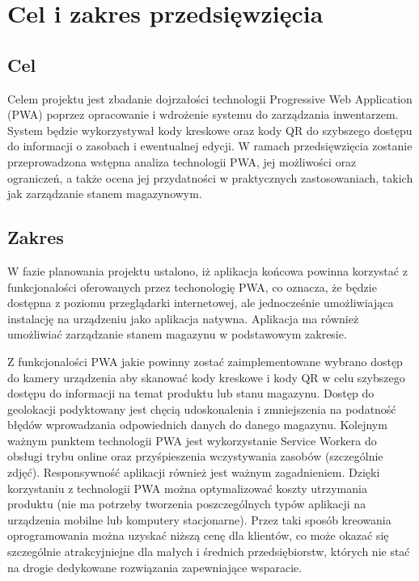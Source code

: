 \documentclass[../main.tex]{subfiles}
\begin{document}
\section{Cel i zakres przedsięwzięcia}
    \subsection{Cel}    
    Celem projektu jest zbadanie dojrzałości technologii Progressive Web Application (PWA)\cite{pwa} poprzez opracowanie i wdrożenie systemu do zarządzania inwentarzem. System będzie wykorzystywał kody kreskowe oraz kody QR do szybszego dostępu do informacji o zasobach i ewentualnej edycji. W ramach przedsięwzięcia zostanie przeprowadzona wstępna analiza technologii PWA, jej możliwości oraz ograniczeń, a także ocena jej przydatności w praktycznych zastosowaniach, takich jak zarządzanie stanem magazynowym.
        

    \subsection{Zakres}
        W fazie planowania projektu ustalono, iż aplikacja końcowa powinna korzystać z funkcjonalości oferowanych przez techonologię PWA, co oznacza, że będzie dostępna z poziomu przeglądarki internetowej, ale jednocześnie umożliwiająca instalację na urządzeniu jako aplikacja natywna. Aplikacja ma również umożliwiać zarządzanie stanem magazynu w podstawowym zakresie. 

        Z funkcjonalości PWA jakie powinny zostać zaimplementowane wybrano dostęp do kamery urządzenia aby skanować kody kreskowe i kody QR w celu szybszego dostępu do informacji na temat produktu lub stanu magazynu. Dostęp do geolokacji podyktowany jest chęcią udoskonalenia i zmniejszenia na podatność błędów wprowadzania odpowiednich danych do danego magazynu. Kolejnym ważnym punktem technologii PWA jest wykorzystanie Service Workera do obsługi trybu online oraz przyśpieszenia wczystywania zasobów (szczególnie zdjęć). Responsywność aplikacji również jest ważnym zagadnieniem. Dzięki korzystaniu z technologii PWA można optymalizować koszty utrzymania produktu (nie ma potrzeby tworzenia poszczególnych typów aplikacji na urządzenia mobilne lub komputery stacjonarne). Przez taki sposób kreowania oprogramowania można uzyskać niższą cenę dla klientów, co może okazać się szczególnie atrakcyjniejne dla małych i średnich przedsiębiorstw, których nie stać na drogie dedykowane rozwiązania zapewniające wsparacie.

\end{document}
